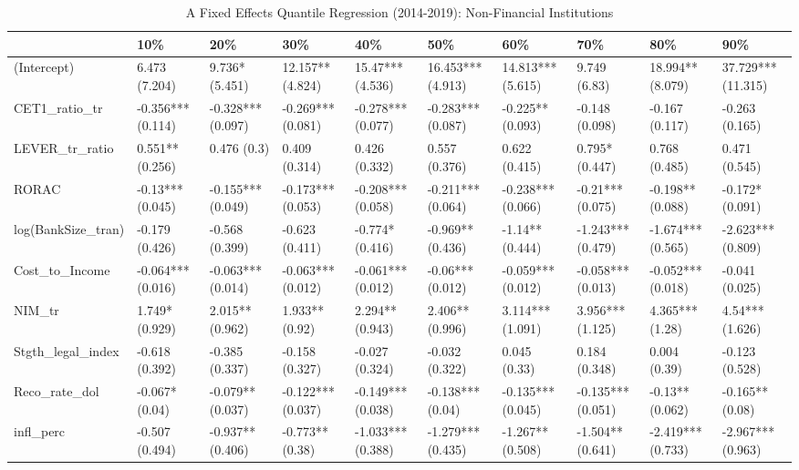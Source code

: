 \begin{table}[ht]
\centering
\caption{A Fixed Effects Quantile Regression (2014-2019): Non-Financial Institutions} 
\begingroup\small
\begin{tabular}{llllllllll}
  \toprule
 & 10\% & 20\% & 30\% & 40\% & 50\% & 60\% & 70\% & 80\% & 90\% \\ 
  \midrule
(Intercept) & 6.473 (7.204) & 9.736* (5.451) & 12.157** (4.824) & 15.47*** (4.536) & 16.453*** (4.913) & 14.813*** (5.615) & 9.749 (6.83) & 18.994** (8.079) & 37.729*** (11.315) \\ 
  CET1\_ratio\_tr & -0.356*** (0.114) & -0.328*** (0.097) & -0.269*** (0.081) & -0.278*** (0.077) & -0.283*** (0.087) & -0.225** (0.093) & -0.148 (0.098) & -0.167 (0.117) & -0.263 (0.165) \\ 
  LEVER\_tr\_ratio & 0.551** (0.256) & 0.476 (0.3) & 0.409 (0.314) & 0.426 (0.332) & 0.557 (0.376) & 0.622 (0.415) & 0.795* (0.447) & 0.768 (0.485) & 0.471 (0.545) \\ 
  RORAC & -0.13*** (0.045) & -0.155*** (0.049) & -0.173*** (0.053) & -0.208*** (0.058) & -0.211*** (0.064) & -0.238*** (0.066) & -0.21*** (0.075) & -0.198** (0.088) & -0.172* (0.091) \\ 
  log(BankSize\_tran) & -0.179 (0.426) & -0.568 (0.399) & -0.623 (0.411) & -0.774* (0.416) & -0.969** (0.436) & -1.14** (0.444) & -1.243*** (0.479) & -1.674*** (0.565) & -2.623*** (0.809) \\ 
  Cost\_to\_Income & -0.064*** (0.016) & -0.063*** (0.014) & -0.063*** (0.012) & -0.061*** (0.012) & -0.06*** (0.012) & -0.059*** (0.012) & -0.058*** (0.013) & -0.052*** (0.018) & -0.041 (0.025) \\ 
  NIM\_tr & 1.749* (0.929) & 2.015** (0.962) & 1.933** (0.92) & 2.294** (0.943) & 2.406** (0.996) & 3.114*** (1.091) & 3.956*** (1.125) & 4.365*** (1.28) & 4.54*** (1.626) \\ 
  Stgth\_legal\_index & -0.618 (0.392) & -0.385 (0.337) & -0.158 (0.327) & -0.027 (0.324) & -0.032 (0.322) & 0.045 (0.33) & 0.184 (0.348) & 0.004 (0.39) & -0.123 (0.528) \\ 
  Reco\_rate\_dol & -0.067* (0.04) & -0.079** (0.037) & -0.122*** (0.037) & -0.149*** (0.038) & -0.138*** (0.04) & -0.135*** (0.045) & -0.135*** (0.051) & -0.13** (0.062) & -0.165** (0.08) \\ 
  infl\_perc & -0.507 (0.494) & -0.937** (0.406) & -0.773** (0.38) & -1.033*** (0.388) & -1.279*** (0.435) & -1.267** (0.508) & -1.504** (0.641) & -2.419*** (0.733) & -2.967*** (0.963) \\ 

\end{tabular}
\end{table}
